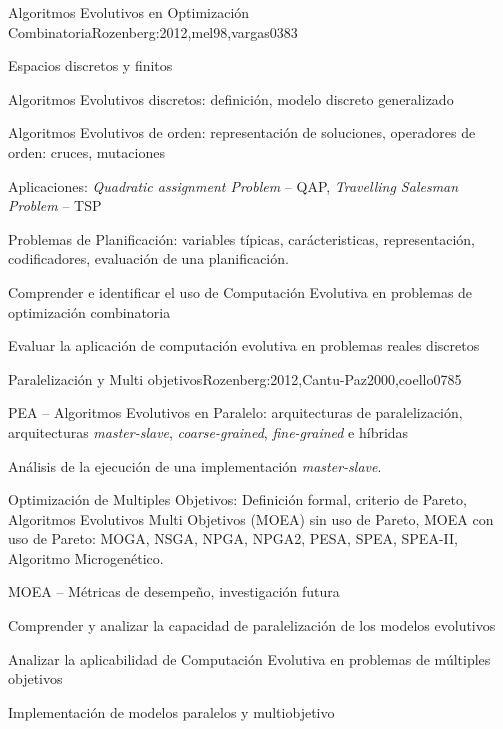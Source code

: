 \begin{syllabus}
\begin{unit}{Algoritmos Evolutivos en Optimización Combinatoria}{Rozenberg:2012,mel98,vargas03}{8}{3}
\begin{topics}
  \item Espacios discretos y finitos
	\item Algoritmos Evolutivos discretos: definición, modelo discreto generalizado
  \item Algoritmos Evolutivos de orden: representación de soluciones, operadores de orden: cruces, mutaciones
	\item Aplicaciones: \textit{Quadratic assignment Problem} -- QAP, \textit{Travelling Salesman Problem} -- TSP
	\item Problemas de Planificación: variables típicas, carácteristicas, representación, codificadores, evaluación de una planificación. 
\end{topics}
\begin{learningoutcomes}
  \item Comprender e identificar el uso de Computación Evolutiva en problemas de optimización combinatoria
  \item Evaluar la aplicación de computación evolutiva en problemas reales discretos
\end{learningoutcomes}
\end{unit}

\begin{unit}{Paralelización y Multi objetivos}{Rozenberg:2012,Cantu-Paz2000,coello07}{8}{5}
\begin{topics}
  \item PEA -- Algoritmos Evolutivos en Paralelo: arquitecturas de paralelización, arquitecturas \textit{master-slave}, \textit{coarse-grained}, \textit{fine-grained} e híbridas 
  \item Análisis de la ejecución de una implementación \textit{master-slave}.
  \item Optimización de Multiples Objetivos: Definición formal, criterio de Pareto, Algoritmos Evolutivos Multi Objetivos (MOEA) sin uso de Pareto, MOEA con uso de Pareto: MOGA, NSGA, NPGA, NPGA2, PESA, SPEA, SPEA-II, Algoritmo Microgenético. 
	\item MOEA -- Métricas de desempeño, investigación futura
\end{topics}
\begin{learningoutcomes}
  \item Comprender y analizar la capacidad de paralelización de los modelos evolutivos
  \item Analizar la aplicabilidad de Computación Evolutiva en problemas de múltiples objetivos
  \item Implementación de modelos paralelos y multiobjetivo
\end{learningoutcomes}
\end{unit}


\end{syllabus}
